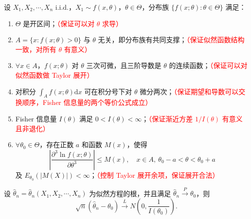 \begin{theorem}
设 $X_1,X_2,\cdots,X_n$ i.i.d.，$X_1\sim f(x,\theta)$，$\theta\in\Theta$，分布族 $\{f(x;\theta):\theta\in\Theta\}$ 满足：
\begin{enumerate}[(1)]
    \item $\Theta$ 是开区间；\textcolor{red}{（保证可以对 $\theta$ 求导）}
    \item $A=\{x:f(x;\theta)>0\}$ 与 $\theta$ 无关，即分布族有共同支撑；\textcolor{red}{（保证似然函数结构一致，对所有 $\theta$ 有意义）}
    \item $\forall x\in A$，$f(x;\theta)$ 对 $\theta$ 三次可微，且三阶导数是 $\theta$ 的连续函数；\textcolor{red}{（保证可以对似然函数做 Taylor 展开）}
    \item 对积分 $\displaystyle\int_A f(x;\theta)\mathrm{d}x$ 可在积分号下对 $\theta$ 微分两次；\textcolor{red}{（保证期望和导数可以交换顺序，Fisher 信息量的两个等价公式成立）}
    \item Fisher 信息量 $I(\theta)$ 满足 $0<I(\theta)<\infty$；\textcolor{red}{（保证渐近方差 $1/I(\theta)$ 有意义且非退化）}
    \item $\forall\theta_0\in\Theta$，存在正数 $a$ 和函数 $M(x)$，使得
    $$
    \left|\frac{\partial^3\ln f(x;\theta)}{\partial\theta^3}\right| \leq M(x), \quad x\in A,\ \theta_0-a<\theta<\theta_0+a
    $$
    及 $E_{\theta_0}(|M(X)|)<\infty$；\textcolor{red}{（控制 Taylor 展开余项，保证展开合法）}
\end{enumerate}
设 $\hat{\theta}_n=\hat{\theta}_n(X_1,X_2,\cdots,X_n)$ 为似然方程的根，并且满足 $\hat{\theta}_n\xrightarrow{P}\theta_0$，则
$$
\sqrt{n}(\hat{\theta}_n-\theta_0)\xrightarrow{L} N\!\left(0,\frac{1}{I(\theta_0)}\right).
$$
\end{theorem}



